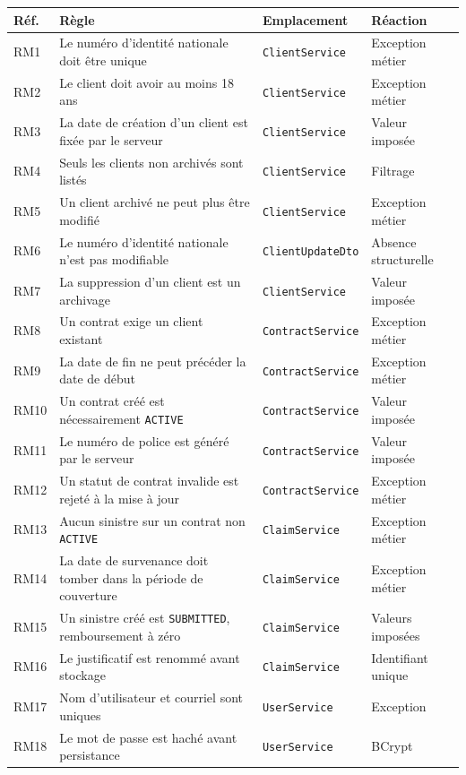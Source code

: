 \documentclass[12pt,a4paper]{report}
\begin{document}
{\small
\begin{tabularx}{\linewidth}{|X|X|X|X|}
\hline
\textbf{Réf.} & \textbf{Règle} & \textbf{Emplacement} & \textbf{Réaction} \\ \hline
RM1 & Le numéro d'identité nationale doit être unique & \texttt{ClientService} & Exception métier \\ \hline
RM2 & Le client doit avoir au moins 18 ans & \texttt{ClientService} & Exception métier \\ \hline
RM3 & La date de création d'un client est fixée par le serveur & \texttt{ClientService} & Valeur imposée \\ \hline
RM4 & Seuls les clients non archivés sont listés & \texttt{ClientService} & Filtrage \\ \hline
RM5 & Un client archivé ne peut plus être modifié & \texttt{ClientService} & Exception métier \\ \hline
RM6 & Le numéro d'identité nationale n'est pas modifiable & \texttt{ClientUpdateDto} & Absence structurelle \\ \hline
RM7 & La suppression d'un client est un archivage & \texttt{ClientService} & Valeur imposée \\ \hline
RM8 & Un contrat exige un client existant & \texttt{ContractService} & Exception métier \\ \hline
RM9 & La date de fin ne peut précéder la date de début & \texttt{ContractService} & Exception métier \\ \hline
RM10 & Un contrat créé est nécessairement \texttt{ACTIVE} & \texttt{ContractService} & Valeur imposée \\ \hline
RM11 & Le numéro de police est généré par le serveur & \texttt{ContractService} & Valeur imposée \\ \hline
RM12 & Un statut de contrat invalide est rejeté à la mise à jour & \texttt{ContractService} & Exception métier \\ \hline
RM13 & Aucun sinistre sur un contrat non \texttt{ACTIVE} & \texttt{ClaimService} & Exception métier \\ \hline
RM14 & La date de survenance doit tomber dans la période de couverture & \texttt{ClaimService} & Exception métier \\ \hline
RM15 & Un sinistre créé est \texttt{SUBMITTED}, remboursement à zéro & \texttt{ClaimService} & Valeurs imposées \\ \hline
RM16 & Le justificatif est renommé avant stockage & \texttt{ClaimService} & Identifiant unique \\ \hline
RM17 & Nom d'utilisateur et courriel sont uniques & \texttt{UserService} & Exception \\ \hline
RM18 & Le mot de passe est haché avant persistance & \texttt{UserService} & BCrypt \\ \hline
\end{tabularx}

}
\end{document}
